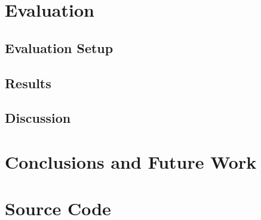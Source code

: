 \documentclass[a4paper,11pt]{article}
\begin{document}
\section{Evaluation}
\label{evaluation}
\subsection{Evaluation Setup}
\label{evaluation:setup}
\subsection{Results}
\label{evaluation:results}
\subsection{Discussion}
\label{evaluation:discussion}

\section{Conclusions and Future Work}
\label{conclusions}




\appendix
\section{Source Code}
\label{source code}
\end{document}
